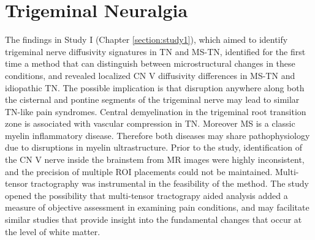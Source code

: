 \section{Trigeminal Neuralgia}

The findings in Study I (Chapter \ref{section:study1}), which aimed to identify trigeminal nerve diffusivity signatures in TN and MS-TN, identified for the first time a method that can distinguish between microstructural changes in these conditions, and revealed localized CN V diffusivity differences in MS-TN and idiopathic TN. The possible implication is that disruption anywhere along both the cisternal and pontine segments of the trigeminal nerve may lead to similar TN-like pain syndromes. Central demyelination in the trigeminal root transition zone is associated with vascular compression in TN. Moreover MS is a classic myelin inflammatory disease. Therefore both diseases may share pathophysiology due to disruptions in myelin ultrastructure. Prior to the study, identification of the CN V nerve inside the brainstem from MR images were highly inconsistent, and the precision of multiple ROI placements could not be maintained. Multi-tensor tractography was instrumental in the feasibility of the method. The study opened the possibility that multi-tensor tractograpy aided analysis added a measure of objective assessment in examining pain conditions, and may facilitate similar studies that provide insight into the fundamental changes that occur at the level of white matter. 

